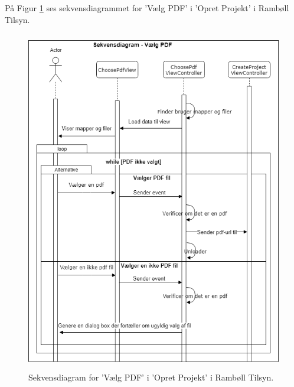 \clearpage

På Figur \ref{fig:VaelgPDF} ses sekvensdiagrammet for 'Vælg PDF' i 'Opret Projekt' i Rambøll Tilsyn.
\begin{figure}[H] %
	\centering
	\includegraphics[height=15cm, width=12cm]{../ArkitekturDesign/Design/OpretProjekt/VaelgPdfDiagram}
	\caption{Sekvensdiagram for 'Vælg PDF' i 'Opret Projekt' i Rambøll Tilsyn.}
	\label{fig:VaelgPDF}
\end{figure}

\clearpage

